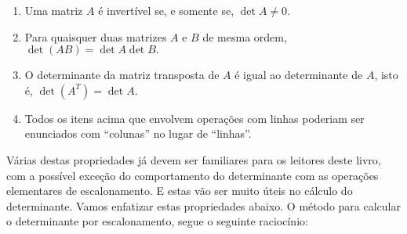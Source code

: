 \documentclass[../livro.tex]{subfiles}  %
\begin{document}
\begin{theorem}
\begin{enumerate}[$(i)$]
\item Uma matriz $A$ é invertível se, e somente se, $\det A \neq 0.$

\item Para quaisquer duas matrizes $A$ e $B$ de mesma ordem, $\det (AB) = \det A \det B.$

\item O determinante da matriz transposta de $A$ é igual ao determinante de $A$, isto é, $\det (A^T) = \det A.$

\item Todos os itens acima que envolvem operações com linhas poderiam ser enunciados com ``colunas'' no lugar de ``linhas''.
\end{enumerate}
\end{theorem}

Várias destas propriedades já devem ser familiares para os leitores deste livro, com a possível exceção do comportamento do determinante com as operações elementares de escalonamento. E estas vão ser muito úteis no cálculo do determinante. Vamos enfatizar estas propriedades abaixo. O método para calcular o determinante por escalonamento, segue o seguinte raciocínio:
\end{document}
